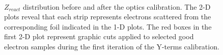 \begin{figure}[!ht]
  \begin{center}
    \\ 
    \caption[$Z_{react}$ distribution before and after the optics calibration]{\footnotesize{$Z_{react}$ distribution before and after the optics calibration. The 2-D plots reveal that each strip represents electrons scattered from the corresponding foil indicated in the 1-D plots. The red boxes in the first 2-D plot represent graphic cuts applied to selected good electron samples during the first iteration of the Y-terms calibration.}}
    \label{optics_vertex}
  \end{center}
\end{figure}

